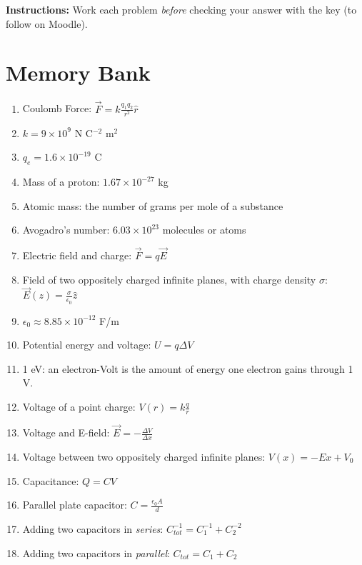 \documentclass[10pt]{article}
\begin{document}
\maketitle

\textbf{Instructions:} Work each problem \textit{before} checking your answer with the key (to follow on Moodle). \\ \vspace{0.25cm}

\section{Memory Bank}

\begin{enumerate}
\item Coulomb Force: $\vec{F} = k \frac{q_1 q_2}{r^2}\hat{r}$
\item $k = 9 \times 10^{9}$ N C$^{-2}$ m$^{2}$
\item $q_e = 1.6 \times 10^{-19}$ C
\item Mass of a proton: $1.67 \times 10^{-27}$ kg
\item Atomic mass: the number of grams per mole of a substance
\item Avogadro's number: $6.03 \times 10^{23}$ molecules or atoms
\item Electric field and charge: $\vec{F} = q \vec{E}$
\item Field of two oppositely charged infinite planes, with charge density $\sigma$: $\vec{E}(z) = \frac{\sigma}{\epsilon_0}\hat{z}$
\item $\epsilon_0 \approx 8.85 \times 10^{-12}$ F/m
\item Potential energy and voltage: $U = q\Delta V$
\item 1 eV: an electron-Volt is the amount of energy one electron gains through 1 V.
\item Voltage of a point charge: $V(r) = k\frac{q}{r}$
\item Voltage and E-field: $\vec{E} = -\frac{\Delta V}{\Delta x}$
\item Voltage between two oppositely charged infinite planes: $V(x) = -E x + V_0$
\item Capacitance: $Q = CV$
\item Parallel plate capacitor: $C = \frac{\epsilon_0 A}{d}$
\item Adding two capacitors in \textit{series}: $C_{tot}^{-1} = C_1^{-1} + C_2^{-2}$
\item Adding two capacitors in \textit{parallel}: $C_{tot} = C_1 + C_2$
\end{enumerate}
\end{document}
